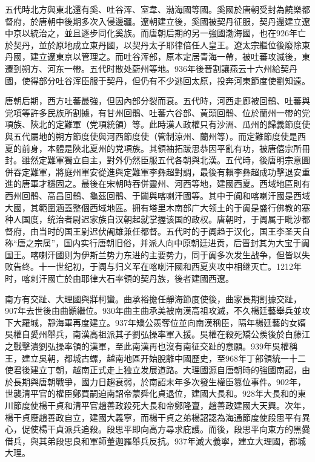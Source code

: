 五代時北方與東北還有奚、吐谷浑、室韋、渤海國等國。奚國於唐朝受封為饒樂都督府，於唐朝中後期多次入侵邊疆。遼朝建立後，奚國被契丹征服，契丹還建立遼中京以統治之，並且逐步同化奚族。而唐朝后期的另一強國渤海國，也在926年亡於契丹，並於原地成立東丹國，以契丹太子耶律倍任人皇王。遼太宗繼位後廢除東丹國，建立遼東京以管理之。而吐谷浑部，原本定居青海一帶，被吐蕃攻滅後，東遷到朔方、河东一帶。五代时散处蔚州等地。936年後晉割讓燕云十六州給契丹國，使得部分吐谷浑臣服于契丹，但仍有不少逃回太原，投奔河東節度使劉知遠。

唐朝后期，西方吐蕃最強，但因內部分裂而衰。五代時，河西走廊被回鶻、吐蕃與党項等許多民族所割據，有甘州回鶻、吐蕃六谷部、黃頭回鶻、位於蘭州一帶的党項族、陝北的定難軍（党項統領）等。此時漢人政權只有沙洲、瓜州的歸義節度使與五代屬地的朔方節度使與河西節度使（管制涼州、蘭州等）。而定難節度使是西夏的前身，本體是陝北夏州的党項族。其領袖拓跋思恭因平亂有功，被唐僖宗所冊封。雖然定難軍獨立自主，對外仍然臣服五代各朝與北漢。五代時，後唐明宗意圖併吞定難軍，將庭州軍安從進與定難軍李彝超對調，最後有賴李彝超成功擊退安重進的唐軍才穩固之。最後在宋朝時吞併靈州、河西等地，建國西夏。西域地區則有西州回鶻、高昌回鶻、龜茲回鶻、于闐與喀喇汗國等。其中于阗和喀喇汗國是西域大國，其範圍涵蓋整個西域地區。拥有塔里木南部广大领土的于阗是盛行佛教的塞种人国度，统治者尉迟家族自汉朝起就掌握该国的政权。唐朝时，于阗属于毗沙都督府，由当时的国王尉迟伏阇雄兼任都督。五代时的于阗趋于汉化，国王李圣天自称“唐之宗属”，国内实行唐朝旧俗，并派人向中原朝廷进贡，后晋封其为大宝于阗国王。喀喇汗國则为伊斯兰势力东进的主要势力，同于阗多次发生战争，但皆以失败告终。十一世纪初，于阗与归义军在喀喇汗國和西夏夹攻中相继灭亡。1212年时，喀剌汗國亡於由耶律大石率領的契丹族，後者建國西遼。

南方有交趾、大理國與牂柯蠻。曲承裕擔任靜海節度使後，曲家長期割據交趾，907年去世後由曲顥繼位。930年曲主曲承美被南漢高祖攻滅，不久楊廷藝舉兵並攻下大羅城，靜海軍再度建立。937年矯公羨奪位並向南漢稱臣，隔年楊廷藝的女婿吳權自愛州舉兵，南漢高祖派其子劉弘操率軍入援。吳權在殺死矯公羨後於白藤江之戰擊潰劉弘操率領的漢軍，至此南漢再也沒有南征交趾的意願。939年吳權稱王，建立吳朝，都城古螺，越南地區开始脫離中國歷史，至968年丁部領統一十二使君後建立丁朝，越南正式走上独立发展道路。大理國源自唐朝時的強國南詔，由於長期與唐朝戰爭，國力日趨衰弱，於南詔末年多次發生權臣篡位事件。902年，世襲清平官的權臣鄭買嗣迫南詔帝蒙舜化貞退位，建國大長和。928年大長和的東川節度使楊干貞和清平官趙善政殺死大長和帝鄭隆亶，趙善政建國大天興。次年，楊干貞廢趙善政自立，建國大義寧，而楊干貞之弟楊詔認為海通節度使段思平有異心，促使楊干貞派兵追殺。段思平即向高方尋求庇護。而後，段思平向東方的黑爨借兵，與其弟段思良和軍師董迦羅舉兵反抗。937年滅大義寧，建立大理國，都城大理。

